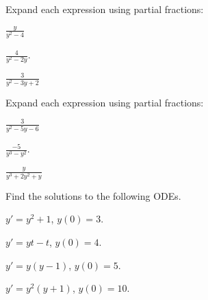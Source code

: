 

\begin{problem}
\item Expand each expression using partial fractions:
  \begin{subproblem}
  \item $\frac{y}{y^2-4}$
    \vfill

  \item $\frac{4}{y^2-2y}$.
    \vfill
      
  \item $\frac{3}{y^2-3y+2}$
    \vfill

  \end{subproblem}
\end{problem}


  \begin{problem}
  \item Expand each expression using partial fractions:
    \begin{subproblem}
    \item $\frac{3}{y^2-5y-6}$
      \vfill

    \item $\frac{-5}{y^3-y^2}$.
      \vfill
      
    \item $\frac{y}{y^3+2y^2+y}$
      \vfill

    \end{subproblem}
    \clearpage
  \item Find the solutions to the following ODEs. 
    \begin{subproblem}
    \item $y' = y^2 + 1$, $y(0)=3$.
      \vfill
    \item $y' = yt - t$, $y(0)=4$.
      \vfill
    \item $y'=y(y-1)$, $y(0)=5$.
      \vfill
    \item $y' = y^2(y+1)$, $y(0)=10$.
      \vfill
    \end{subproblem}

  \end{problem}


